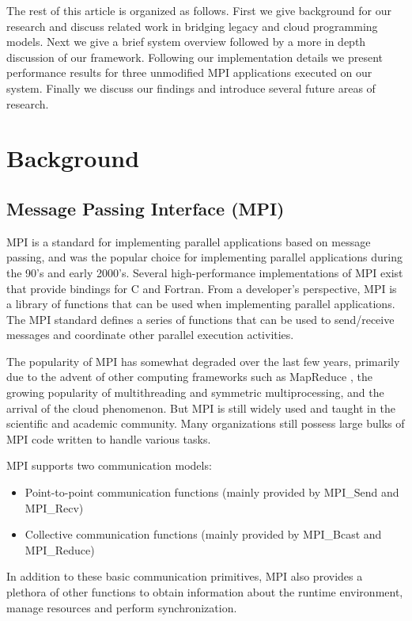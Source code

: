 \documentclass[conference,10pt] {IEEEtran}
\begin{document}
The rest of this article is organized as follows. First we give background for our research and discuss related work in bridging legacy and cloud programming models. Next we give a brief system overview followed by a more in depth discussion of our framework. Following our implementation details we present performance results for three unmodified MPI applications executed on our system. Finally we discuss our findings and introduce several future areas of research.

\section{Background}
\label{sec:background}

\subsection{Message Passing Interface (MPI)}
MPI is a standard for implementing parallel applications based on message passing, and was the popular choice for implementing parallel applications during the 90's and early 2000's. Several high-performance implementations of MPI exist that provide bindings for C and Fortran. From a developer's perspective, MPI is a library of functions that can be used when implementing parallel applications. The MPI standard defines a series of functions that can be used to send/receive messages and coordinate other parallel execution activities.

The popularity of MPI has somewhat degraded over the last few years, primarily due to the advent of other computing frameworks such as MapReduce \cite{Dean:2008:MSD:1327452.1327492}, the growing popularity of multithreading and symmetric multiprocessing, and the arrival of the cloud phenomenon. But MPI is still widely used and taught in the scientific and academic community. Many organizations still possess large bulks of MPI code written to handle various tasks.

MPI supports two communication models:
\begin{itemize}
\item Point-to-point communication functions (mainly provided by MPI\_Send and MPI\_Recv)
\item Collective communication functions (mainly provided by MPI\_Bcast and MPI\_Reduce)
\end{itemize}	
In addition to these basic communication primitives, MPI also provides a plethora of other functions to obtain information about the runtime environment, manage resources and perform synchronization.
\end{document}
